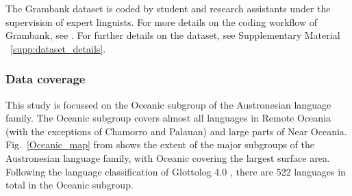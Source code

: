 \documentclass[a4paper,10pt]{article} %
\begin{document}
The Grambank dataset is coded by student and research assistants under the supervision of expert linguists. For more details on the coding workflow of Grambank, see \citet{slingerland2020coding}. For further details on the dataset, see Supplementary Material ~\ref{supp:dataset_details}.



\subsubsection{Data coverage} 
This study is focussed on the Oceanic subgroup of the Austronesian language family. The Oceanic subgroup covers almost all languages in Remote Oceania (with the exceptions of Chamorro and Palauan) and large parts of Near Oceania. Fig.~\ref{Oceanic_map} from \citet[2]{protooceanicvol5} shows the extent of the major subgroups of the Austronesian language family, with Oceanic covering the largest surface area. Following the language classification of Glottolog 4.0 \citep{glottolog40}, there are 522 languages in total in the Oceanic subgroup.
\end{document}
